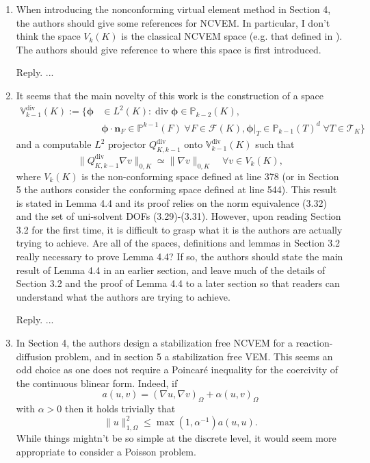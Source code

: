 \documentclass[10pt]{amsart}
\theoremstyle{definition}
\theoremstyle{remark}
\renewcommand{\div}{\operatorname{div}}
\begin{document}
\begin{enumerate}[1.]
\medskip

\item \textsf{When introducing the nonconforming virtual element method in Section 4, the authors should give some references for NCVEM. In particular, I don’t think the space $V_k(K)$ is the classical NCVEM space (e.g. that defined in \cite{AyusodeDiosLipnikovManzini2016}). The authors should give reference to where this space is first introduced.}

\smallskip \noindent \textcolor[rgb]{1.00,0.00,0.00}{Reply.}
...

\medskip

\item \textsf{It seems that the main novelty of this work is the construction of a space
\begin{align*}
\mathbb V_{k-1}^{\div}(K):=\{\boldsymbol{\phi}&\in L^2(K): \div\boldsymbol{\phi}\in\mathbb P_{k-2}(K), \\
& \boldsymbol{\phi}\cdot\boldsymbol{n}_F\in\mathbb P^{k-1}(F)\;\forall F\in\mathcal F(K), \boldsymbol{\phi}|_T\in\mathbb P_{k-1}(T)^d\;\forall T\in\mathcal T_K
\}
\end{align*}
and a computable $L^2$ projector $Q_{K,k-1}^{\div}$ onto $\mathbb V_{k-1}^{\div}(K)$ such that
$$
\|Q_{K,k-1}^{\div}\nabla v\|_{0,K}\simeq \|\nabla v\|_{0,K} \quad\forall v\in V_k(K),
$$
where $V_k(K)$ is the non-conforming space defined at line 378 (or in Section 5 the authors consider the conforming space defined at line 544). This result is stated in Lemma 4.4 and its proof relies on the norm equivalence (3.32) and the set of uni-solvent DOFs (3.29)-(3.31). However, upon reading Section 3.2 for the first time, it is difficult to grasp what it is the authors are actually trying to achieve. Are all of the spaces, definitions and lemmas in Section 3.2 really necessary to prove Lemma 4.4? If so, the authors should state the main result of Lemma 4.4 in an earlier section, and leave much of the details of Section 3.2 and the proof of Lemma 4.4 to a later section so that readers can understand what the authors are trying to achieve.}

\smallskip \noindent \textcolor[rgb]{1.00,0.00,0.00}{Reply.}
...

\medskip

\item \textsf{In Section 4, the authors design a stabilization free NCVEM for a reaction-diffusion problem, and in section 5 a stabilization free VEM. This seems an odd choice as one does not require a Poincar\'e inequality for the coercivity of the continuous blinear form. Indeed, if
$$
a(u, v)=(\nabla u, \nabla v)_{\Omega}+\alpha (u, v)_{\Omega}
$$
with $\alpha > 0$ then it holds trivially that
$$
\|u\|_{1,\Omega}^2\leq\max(1,\alpha^{-1})a(u,u).
$$
While things mightn't be so simple at the discrete level, it would seem more
appropriate to consider a Poisson problem.}


\end{enumerate}
\end{document}
